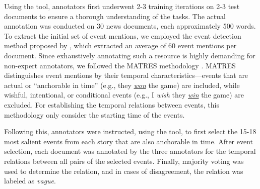 Using the tool, annotators first underwent 2-3 training iterations on 2-3 test documents to ensure a thorough understanding of the tasks. The actual annotation was conducted on 30 news documents, each approximately 500 words. To extract the initial set of event mentions, we employed the event detection method proposed by \citet{cattan-etal-2021-cross-document}, which extracted an average of 60 event mentions per document. Since exhaustively annotating such a resource is highly demanding for non-expert annotators, we followed the MATRES methodology \cite{ning-etal-2018-multi}. MATRES distinguishes event mentions by their temporal characteristics—events that are actual or ``anchorable in time'' (e.g., they \textit{\underline{won}} the game) are included, while wishful, intentional, or conditional events (e.g., I \textit{wish} they \textit{\underline{win}} the game) are excluded. For establishing the temporal relations between events, this methodology only consider the starting time of the events.

Following this, annotators were instructed, using the tool, to first select the 15-18 most salient events from each story that are also anchorable in time. After event selection, each document was annotated by the three annotators for the temporal relations between all pairs of the selected events. Finally, majority voting was used to determine the relation, and in cases of disagreement, the relation was labeled as \textit{vague}.



